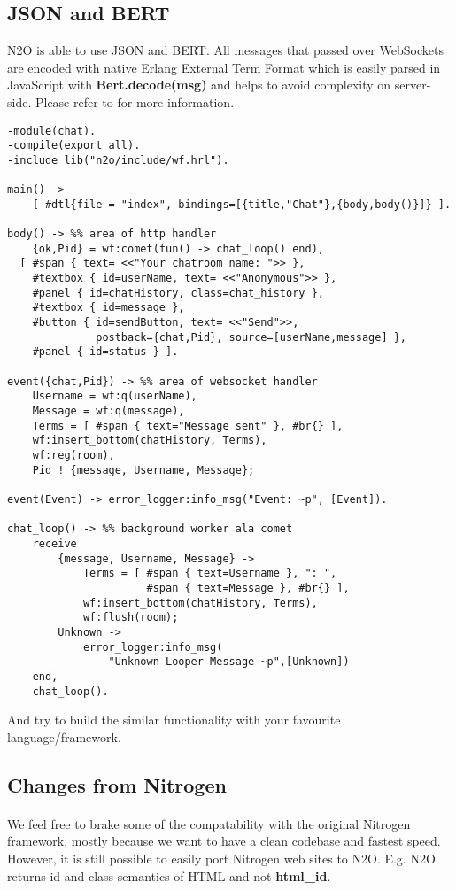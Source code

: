 \subsection*{JSON and BERT}
N2O is able to use JSON and BERT. All messages that passed over
WebSockets are encoded with native Erlang External Term Format
which is easily parsed in JavaScript with {\bf Bert.decode(msg)}
and helps to avoid complexity on server-side. Please refer
to  for more information.

\newpage
\begin{lstlisting}[caption=chat.erl]
-module(chat).
-compile(export_all).
-include_lib("n2o/include/wf.hrl").

main() -> 
    [ #dtl{file = "index", bindings=[{title,"Chat"},{body,body()}]} ].

body() -> %% area of http handler
    {ok,Pid} = wf:comet(fun() -> chat_loop() end),
  [ #span { text= <<"Your chatroom name: ">> }, 
    #textbox { id=userName, text= <<"Anonymous">> },
    #panel { id=chatHistory, class=chat_history },
    #textbox { id=message },
    #button { id=sendButton, text= <<"Send">>, 
              postback={chat,Pid}, source=[userName,message] },
    #panel { id=status } ].

event({chat,Pid}) -> %% area of websocket handler
    Username = wf:q(userName),
    Message = wf:q(message),
    Terms = [ #span { text="Message sent" }, #br{} ],
    wf:insert_bottom(chatHistory, Terms),
    wf:reg(room),
    Pid ! {message, Username, Message};

event(Event) -> error_logger:info_msg("Event: ~p", [Event]).

chat_loop() -> %% background worker ala comet
    receive 
        {message, Username, Message} ->
            Terms = [ #span { text=Username }, ": ",
                      #span { text=Message }, #br{} ],
            wf:insert_bottom(chatHistory, Terms),
            wf:flush(room);
        Unknown -> 
            error_logger:info_msg(
                "Unknown Looper Message ~p",[Unknown])
    end,
    chat_loop().
\end{lstlisting}

And try to build the similar functionality with your favourite language/framework.

\subsection*{Changes from Nitrogen}
\paragraph{}
We feel free to brake some of the compatability with the original
Nitrogen framework, mostly because we want to have a clean codebase
and fastest speed. However, it is still possible to easily port
Nitrogen web sites to N2O. E.g. N2O returns id and class semantics
of HTML and not {\bf html\_id}.


